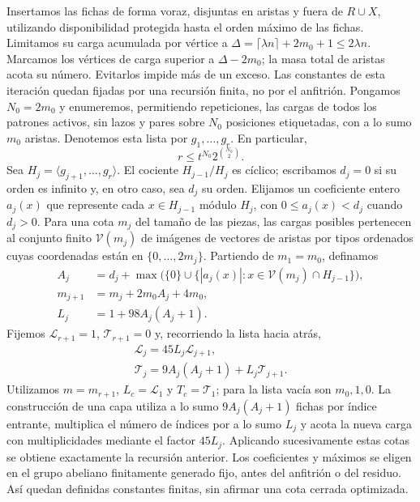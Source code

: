 \documentclass[spanish,11pt,a4paper]{article}
\begin{document}
Insertamos las fichas de forma voraz, disjuntas en aristas y fuera de \(R\cup X\), utilizando disponibilidad protegida hasta el orden máximo de las fichas. Limitamos su carga acumulada por vértice a \(\Delta=\lceil\lambda n\rceil+2m_0+1\le2\lambda n\). Marcamos los vértices de carga superior a \(\Delta-2m_0\); la masa total de aristas acota su número. Evitarlos impide más de un exceso. Las constantes de esta iteración quedan fijadas por una recursión finita, no por el anfitrión. Pongamos \(N_0=2m_0\) y enumeremos, permitiendo repeticiones, las cargas de todos los patrones activos, sin lazos y pares sobre \(N_0\) posiciones etiquetadas, con a lo sumo \(m_0\) aristas. Denotemos esta lista por \(g_1,\ldots,g_r\). En particular, \[r\le t^{N_0}2^{\binom{N_0}{2}}.\] Sea \(H_j=\langle g_{j+1},\ldots,g_r\rangle\). El cociente \(H_{j-1}/H_j\) es cíclico; escribamos \(d_j=0\) si su orden es infinito y, en otro caso, sea \(d_j\) su orden. Elijamos un coeficiente entero \(a_j(x)\) que represente cada \(x\in H_{j-1}\) módulo \(H_j\), con \(0\le a_j(x)<d_j\) cuando \(d_j>0\). Para una cota \(m_j\) del tamaño de las piezas, las cargas posibles pertenecen al conjunto finito \(\mathcal V(m_j)\) de imágenes de vectores de aristas por tipos ordenados cuyas coordenadas están en \(\{0,\ldots,2m_j\}\). Partiendo de \(m_1=m_0\), definamos \[\begin{aligned}
A_j&=d_j+\max\bigl(\{0\}\cup\{|a_j(x)|:x\in\mathcal V(m_j)\cap H_{j-1}\}\bigr),\\
m_{j+1}&=m_j+2m_0A_j+4m_0,\\
L_j&=1+98A_j(A_j+1).
\end{aligned}\] Fijemos \(\mathcal L_{r+1}=1\), \(\mathcal T_{r+1}=0\) y, recorriendo la lista hacia atrás, \[\begin{gathered}
\mathcal L_j=45L_j\mathcal L_{j+1},\\
\mathcal T_j=9A_j(A_j+1)+L_j\mathcal T_{j+1}.
\end{gathered}\] Utilizamos \(m=m_{r+1}\), \(L_c=\mathcal L_1\) y \(T_c=\mathcal T_1\); para la lista vacía son \(m_0,1,0\). La construcción de una capa utiliza a lo sumo \(9A_j(A_j+1)\) fichas por índice entrante, multiplica el número de índices por a lo sumo \(L_j\) y acota la nueva carga con multiplicidades mediante el factor \(45L_j\). Aplicando sucesivamente estas cotas se obtiene exactamente la recursión anterior. Los coeficientes y máximos se eligen en el grupo abeliano finitamente generado fijo, antes del anfitrión o del residuo. Así quedan definidas constantes finitas, sin afirmar una cota cerrada optimizada.
\end{document}
